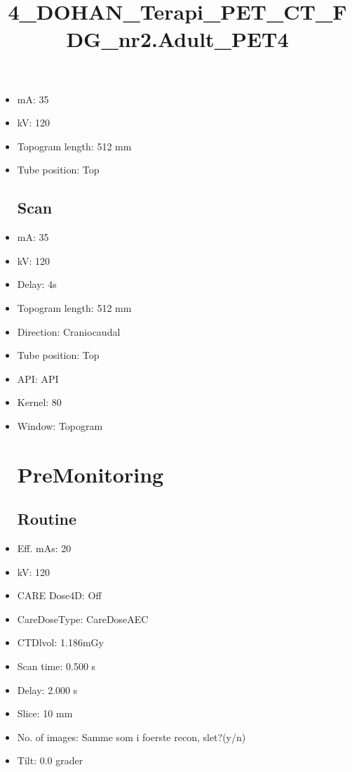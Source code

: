 \documentclass[12pt]{article}
\title{4\_DOHAN\_Terapi\_PET\_CT\_FDG\_nr2.Adult\_PET4}
\begin{document}
\maketitle
\newpage
\tableofcontents
\newpage
{}


\begin{itemize}\section{Topogram}
\subsection{Routine}
\item mA: 35\item kV: 120\item Topogram length: 512 mm\item Tube position: Top
\subsection{Scan}\item mA: 35\item kV: 120\item Delay: 4s\item Topogram length: 512 mm\item Direction: Craniocaudal\item Tube position: Top\item API: API \item Kernel: 80\item Window: Topogram
\section{PreMonitoring}
\subsection{Routine}
\item Eff. mAs: 20\item kV: 120\item CARE Dose4D: Off\item CareDoseType: CareDoseAEC\item CTDlvol: 1.186mGy\item Scan time: 0.500 s\item Delay: 2.000 s\item Slice: 10 mm\item No. of images: Samme som i foerste recon, slet?(y/n)\item Tilt: 0.0 grader

\end{itemize}
\end{document}
